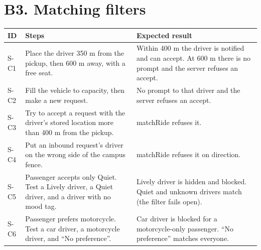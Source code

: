 \section*{B3. Matching filters}
\small
\begin{longtable}{|p{1.1cm}|p{6.6cm}|p{6.3cm}|}
\hline
\textbf{ID} & \textbf{Steps} & \textbf{Expected result} \\
\hline
\endhead
S-C1 & Place the driver 350 m from the pickup, then 600 m away, with a free seat. & Within 400 m the driver is notified and can accept. At 600 m there is no prompt and the server refuses an accept. \\
\hline
S-C2 & Fill the vehicle to capacity, then make a new request. & No prompt to that driver and the server refuses an accept. \\
\hline
S-C3 & Try to accept a request with the driver’s stored location more than 400 m from the pickup. & matchRide refuses it. \\
\hline
S-C4 & Put an inbound request’s driver on the wrong side of the campus fence. & matchRide refuses it on direction. \\
\hline
S-C5 & Passenger accepts only Quiet. Test a Lively driver, a Quiet driver, and a driver with no mood tag. & Lively driver is hidden and blocked. Quiet and unknown drivers match (the filter fails open). \\
\hline
S-C6 & Passenger prefers motorcycle. Test a car driver, a motorcycle driver, and “No preference”. & Car driver is blocked for a motorcycle-only passenger. “No preference” matches everyone. \\
\hline
\end{longtable}
\normalsize

